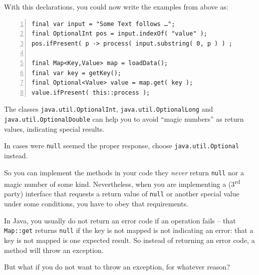 With this declarations, you could now write the examples from above as:
\begin{lstlisting}[numbers=left]
final var input = "Some Text follows …";
final OptionalInt pos = input.indexOf( "value" );
pos.ifPresent( p -> process( input.substring( 0, p ) ) ;

final Map<Key,Value> map = loadData();
final var key = getKey();
final Optional<Value> value = map.get( key );
value.ifPresent( this::process );
\end{lstlisting}

The classes \lstinline|java.util.OptionalInt|\autocite{ORACLE_DOC_OPTIONALINT_CLASS}, \lstinline|java.util.OptionalLong|\autocite{ORACLE_DOC_OPTIONALLONG_CLASS} and \lstinline|java.util.OptionalDouble|\autocite{ORACLE_DOC_OPTIONALDOUBLE_CLASS} can help you to avoid “magic numbers” as return values, indicating special results.

In cases were \lstinline|null| seemed the proper response, choose \lstinline|java.util.Optional|\autocite{ORACLE_DOC_OPTIONAL_CLASS} instead.

So you can implement the methods in your code they \textit{never} return \lstinline|null| nor a magic number of some kind. Nevertheless, when you are implementing a (3\textsuperscript{rd} party) interface that requests a return value of \lstinline|null| or another special value under some conditions, you have to obey that requirements.

In Java, you usually do not return an error code if an operation fails – that \lstinline|Map::get| returns \lstinline|null| if the key is not mapped is not indicating an error: that a key is not mapped is one expected result. So instead of returning an error code, a method will throw an exception.

But what if you do not want to throw an exception, for whatever reason?

